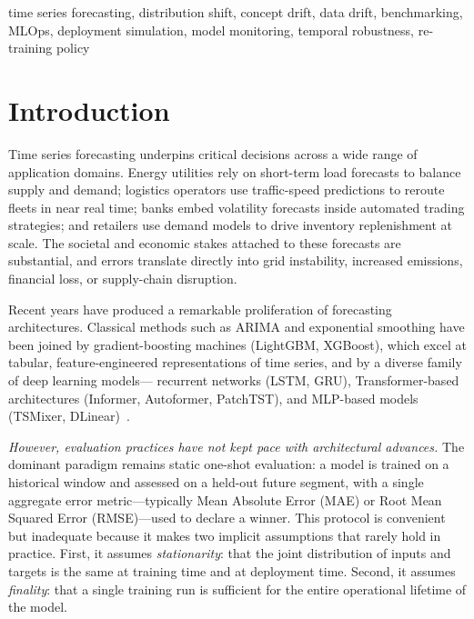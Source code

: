 \documentclass[conference]{IEEEtran}
\begin{document}
\begin{IEEEkeywords}
	time series forecasting, distribution shift, concept drift,
	data drift, benchmarking, MLOps, deployment simulation,
	model monitoring, temporal robustness, re-training policy
\end{IEEEkeywords}

\section{Introduction}

Time series forecasting underpins critical decisions across a wide
range of application domains. Energy utilities rely on short-term load
forecasts to balance supply and demand; logistics operators use
traffic-speed predictions to reroute fleets in near real time; banks
embed volatility forecasts inside automated trading strategies; and
retailers use demand models to drive inventory replenishment at scale.
The societal and economic stakes attached to these forecasts are
substantial, and errors translate directly into grid instability,
increased emissions, financial loss, or supply-chain disruption.

Recent years have produced a remarkable proliferation of forecasting
architectures. Classical methods such as ARIMA and exponential
smoothing have been joined by gradient-boosting machines (LightGBM,
XGBoost), which excel at tabular, feature-engineered representations
of time series, and by a diverse family of deep learning models---
recurrent networks (LSTM, GRU), Transformer-based architectures
(Informer, Autoformer, PatchTST), and MLP-based models
(TSMixer, DLinear)~\cite{tslib, deep_time_series_survey}.

\textit{However, evaluation practices have not kept pace with
	architectural advances.} The dominant paradigm remains static
one-shot evaluation: a model is trained on a historical window and
assessed on a held-out future segment, with a single aggregate error
metric---typically Mean Absolute Error (MAE) or Root Mean Squared
Error (RMSE)---used to declare a winner. This protocol is convenient
but inadequate because it makes two implicit assumptions that rarely
hold in practice. First, it assumes \textit{stationarity}: that the
joint distribution of inputs and targets is the same at training time
and at deployment time. Second, it assumes \textit{finality}: that a
single training run is sufficient for the entire operational lifetime
of the model.
\end{document}

